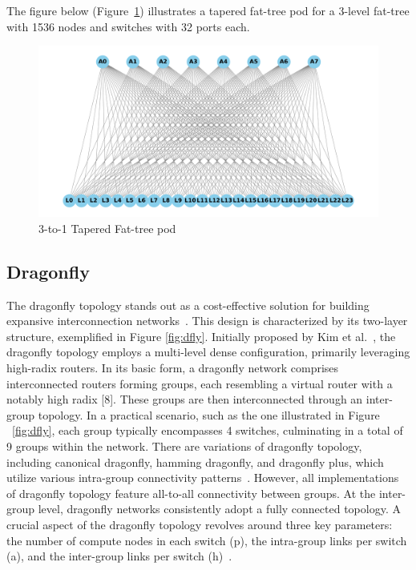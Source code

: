 The figure below (Figure~\ref{fig:tapered_ft}) illustrates a tapered fat-tree pod for a 3-level fat-tree with 1536 nodes and switches with 32 ports each.
\begin{figure}[h]
  \centering
  \includegraphics[width=\columnwidth]{./figs_4/tapered_fat_tree_pod.pdf}
  \caption{3-to-1 Tapered Fat-tree pod}
  \label{fig:tapered_ft}
\end{figure}


\subsection{Dragonfly} The dragonfly topology stands out as a cost-effective
solution for building expansive interconnection networks~\cite{kim2008technology}. This design is
characterized by its two-layer structure, exemplified in Figure \ref{fig:dfly}. Initially
proposed by Kim et al.~\cite{kim2008technology}, the dragonfly topology employs a multi-level dense
configuration, primarily leveraging high-radix routers.  In its basic form, a
dragonfly network comprises interconnected routers forming groups, each
resembling a virtual router with a notably high radix [8]. These groups are then
interconnected through an inter-group topology. In a practical scenario, such as
the one illustrated in Figure ~\ref{fig:dfly}, each group typically encompasses 4 switches,
culminating in a total of 9 groups within the network.  There are variations of
dragonfly topology, including canonical dragonfly, hamming dragonfly, and
dragonfly plus, which utilize various intra-group connectivity patterns~\cite{hastings2015comparing}.
However, all implementations of dragonfly topology feature all-to-all
connectivity between groups. At the inter-group level, dragonfly networks
consistently adopt a fully connected topology.  A crucial aspect of the
dragonfly topology revolves around three key parameters: the number of compute
nodes in each switch (p), the intra-group links per switch (a), and the
inter-group links per switch (h)~\cite{kim2008technology}. 


